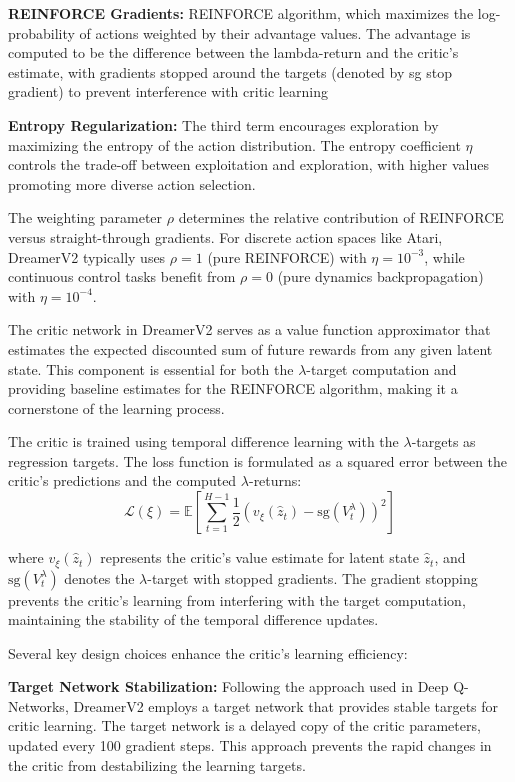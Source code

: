 \documentclass[
	english,
	ruledheaders=section,
	class=report,
	thesis={type=master},
	accentcolor=9c,
	custommargins=true,
	marginpar=false,
	parskip=half-,
	fontsize=11pt,
]{tudapub}
\begin{document}
\textbf{REINFORCE Gradients:}  REINFORCE algorithm, which maximizes the log-probability of actions weighted by their advantage values. The advantage is computed to be the difference between the lambda-return and the critic's estimate, with gradients stopped around the targets (denoted by sg stop gradient) to prevent interference with critic learning

\textbf{Entropy Regularization:} The third term encourages exploration by maximizing the entropy of the action distribution. The entropy coefficient $\eta$ controls the trade-off between exploitation and exploration, with higher values promoting more diverse action selection.

The weighting parameter $\rho$ determines the relative contribution of REINFORCE versus straight-through gradients. For discrete action spaces like Atari, DreamerV2 typically uses $\rho = 1$ (pure REINFORCE) with $\eta = 10^{-3}$, while continuous control tasks benefit from $\rho = 0$ (pure dynamics backpropagation) with $\eta = 10^{-4}$.

The critic network in DreamerV2 serves as a value function approximator that estimates the expected discounted sum of future rewards from any given latent state. This component is essential for both the $\lambda$-target computation and providing baseline estimates for the REINFORCE algorithm, making it a cornerstone of the learning process.

The critic is trained using temporal difference learning with the $\lambda$-targets as regression targets. The loss function is formulated as a squared error between the critic's predictions and the computed $\lambda$-returns:
\begin{equation}
	\mathcal{L}(\xi) = \mathbb{E}\left[\sum_{t=1}^{H-1} \frac{1}{2} \left(v_\xi(\hat{z}_t) - \text{sg}(V^{\lambda}_t)\right)^2\right]
\end{equation}

where $v_\xi(\hat{z}_t)$ represents the critic's value estimate for latent state $\hat{z}_t$, and $\text{sg}(V^{\lambda}_t)$ denotes the $\lambda$-target with stopped gradients. The gradient stopping prevents the critic's learning from interfering with the target computation, maintaining the stability of the temporal difference updates.

Several key design choices enhance the critic's learning efficiency:

\textbf{Target Network Stabilization:} Following the approach used in Deep Q-Networks, DreamerV2 employs a target network that provides stable targets for critic learning. The target network is a delayed copy of the critic parameters, updated every 100 gradient steps. This approach prevents the rapid changes in the critic from destabilizing the learning targets.
\end{document}
